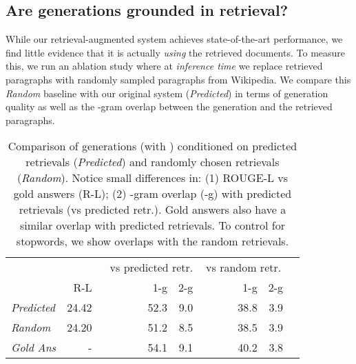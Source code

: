 \documentclass[11pt]{article}
\begin{document}
\subsection{Are generations grounded in retrieval?}
\label{sec:grounding}

While our retrieval-augmented system achieves state-of-the-art performance, we find little evidence that it is actually \emph{using} the retrieved documents. To measure this, we run an ablation study where at \emph{inference time} we replace retrieved paragraphs with randomly sampled paragraphs from Wikipedia. We compare this \emph{Random} baseline with our original system (\emph{Predicted}) in terms of generation quality as well as the -gram overlap between the generation and the retrieved paragraphs.\\

\begin{table}[t]
\small
\begin{center}
\begin{tabular}{ lrrrrrr } 
 \toprule
   &  & \multicolumn{2}{r}{vs predicted retr.} & \multicolumn{2}{c}{vs random retr.} \\
 & R-L & ~~~~~~~~~1-g & 2-g & ~~~~~~~1-g & 2-g \\
\midrule
\emph{Predicted}  & 24.42 & 52.3 & 9.0 & 38.8 & 3.9 \\
\emph{Random} & 24.20 & 51.2 & 8.5 & 38.5 & 3.9 \\
\midrule
\emph{Gold Ans} & - & 54.1 & 9.1 & 40.2 & 3.8 \\
\bottomrule
\end{tabular}
\end{center}
\caption{Comparison of generations (with ) conditioned on predicted retrievals (\emph{Predicted}) and randomly chosen retrievals (\emph{Random}). Notice small differences in: (1) ROUGE-L vs gold answers (R-L); (2) -gram overlap (-g) with predicted retrievals (vs predicted retr.). Gold answers also have a similar overlap with predicted retrievals. To control for stopwords, we show overlaps with the random retrievals.}
\label{tab:pred_vs_random_all}
\end{table}
\end{document}
